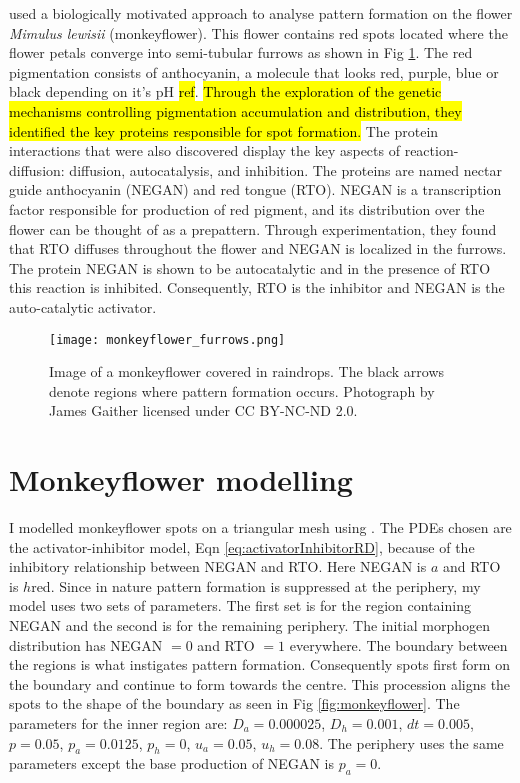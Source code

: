\cite{Ding2018} used a biologically motivated approach to analyse pattern formation on the flower \textit{Mimulus lewisii} (monkeyflower). This flower contains red spots located where the flower petals converge into semi-tubular furrows as shown in Fig \ref{fig:monkeyflower_real}. The red pigmentation consists of anthocyanin, a molecule that looks red, purple, blue or black depending on it's pH \hl{ref}. \hl{Through the exploration of the genetic mechanisms controlling pigmentation accumulation and distribution, they identified the key proteins responsible for spot formation.} The protein interactions that were also discovered display the key aspects of reaction-diffusion: diffusion, autocatalysis, and inhibition. The proteins are named nectar guide anthocyanin (NEGAN) and red tongue (RTO). NEGAN is a transcription factor responsible for production of red pigment, and its distribution over the flower can be thought of as a prepattern. Through experimentation, they found that RTO diffuses throughout the flower and NEGAN is localized in the furrows. The protein NEGAN is shown to be autocatalytic and in the presence of RTO this reaction is inhibited. Consequently, RTO is the inhibitor and NEGAN is the auto-catalytic activator.

\begin{figure}[ht]
	\centering
	\texttt{[image: monkeyflower\_furrows.png]}
	\caption{Image of a monkeyflower covered in raindrops. The black arrows denote regions where pattern formation occurs. Photograph by James Gaither licensed under CC BY-NC-ND 2.0.}
	\label{fig:monkeyflower_real}
\end{figure}

\section{Monkeyflower modelling}
I modelled monkeyflower spots on a triangular mesh using \ProgramName{}. The PDEs chosen are the activator-inhibitor model, Eqn \eqref{eq:activatorInhibitorRD}, because of the inhibitory relationship between NEGAN and RTO. Here NEGAN is $a$ and RTO is $h$red. Since in nature pattern formation is suppressed at the periphery, my model uses two sets of parameters. The first set is for the region containing NEGAN and the second is for the remaining periphery. The initial morphogen distribution has NEGAN $= 0$ and RTO $= 1$ everywhere. The boundary between the regions is what instigates pattern formation. Consequently spots first form on the boundary and continue to form towards the centre. This procession aligns the spots to the shape of the boundary as seen in Fig \ref{fig:monkeyflower}. The parameters for the inner region are: $D_a=0.000025$, $D_h=0.001$, $dt=0.005$, $p=0.05$, $p_a=0.0125$, $p_h=0$, $u_a=0.05$, $u_h=0.08$. The periphery uses the same parameters except the base production of NEGAN is $p_a=0$.

